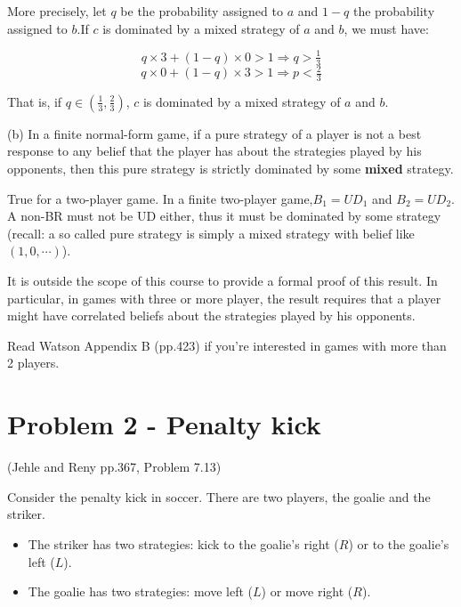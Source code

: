 \documentclass{article}
\begin{document}
\begin{mdframed}[backgroundcolor=blue!20,linecolor=white]
More precisely, let $q$ be the probability assigned to $a$ and $1-q$ the probability assigned to $b$.If ${c}$ is dominated by a mixed strategy of $a$ and $b$, we must have:

$$q\times 3 + (1-q)\times 0 > 1 \Rightarrow q > \tfrac13 $$
$$q\times 0 + (1-q)\times 3 >1 \Rightarrow p < \tfrac23 $$

That is, if $q\in (\tfrac13,\tfrac23)$, ${c}$ is dominated by a mixed strategy of $a$ and $b$.

\end{mdframed}


%
(b) In a finite normal-form game, if a pure strategy of a
player is not a best response to any belief that the player has about the strategies played by his opponents, then this pure strategy is strictly dominated by some \textbf{mixed} strategy.

\medskip

True for a two-player game. In a finite two-player game,$B_1 = UD_1$ and $B_2 = UD_2$. A non-BR must not be UD either, thus it must be dominated by some strategy (recall: a so called pure strategy is simply a mixed strategy with belief like $(1,0,\cdots)$).


\begin{mdframed}[backgroundcolor=blue!20,linecolor=white]
It is outside the scope of this course to provide a formal proof of this result. In particular, in games with three or more player, the result requires that a player might have correlated beliefs about the strategies played by his opponents.

\smallskip

Read Watson Appendix B (pp.423) if you're interested in games with more than 2 players.
\end{mdframed}

\newpage
\section{Problem 2 - Penalty kick} 

(Jehle and Reny pp.367, Problem 7.13)

Consider the penalty kick in soccer. There are two players, the goalie and the striker. 
\begin{itemize}
\item The striker has two strategies: kick to the goalie's right ($R$) or to the goalie's left ($L$). 
\item The goalie has two strategies: move left ($L$) or move right ($R$). 
\end{itemize}
\end{document}
